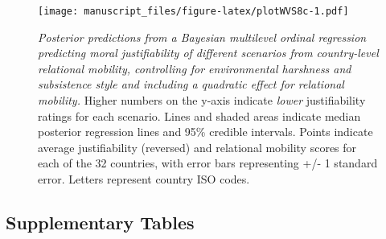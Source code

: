 \documentclass[
  man,floatsintext]{apa6}
\begin{document}
\newpage



\begin{figure}
\centering
\texttt{[image: manuscript\_files/figure-latex/plotWVS8c-1.pdf]}
\caption{\label{fig:plotWVS8c}\emph{Posterior predictions from a Bayesian multilevel ordinal regression predicting moral justifiability of different scenarios from country-level relational mobility, controlling for environmental harshness and subsistence style and including a quadratic effect for relational mobility.} Higher numbers on the y-axis indicate \emph{lower} justifiability ratings for each scenario. Lines and shaded areas indicate median posterior regression lines and 95\% credible intervals. Points indicate average justifiability (reversed) and relational mobility scores for each of the 32 countries, with error bars representing +/- 1 standard error. Letters represent country ISO codes.}
\end{figure}

\newpage

\hypertarget{supplementary-tables}{%
\subsection{Supplementary Tables}\label{supplementary-tables}}
\end{document}
